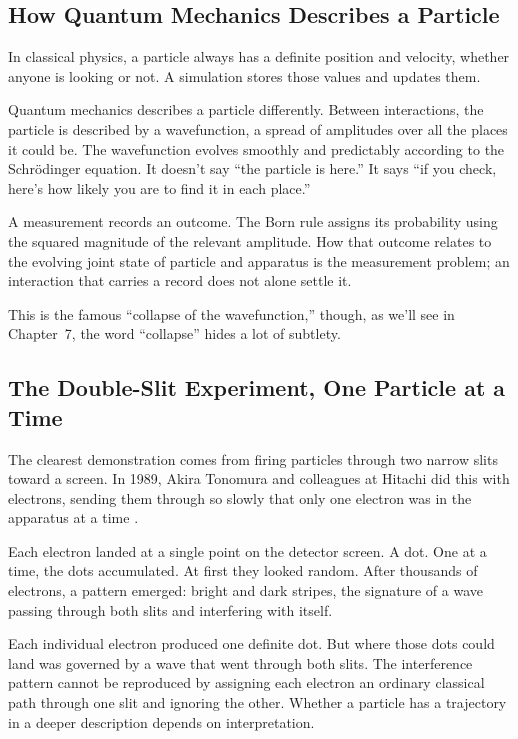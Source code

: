 \subsection{How Quantum Mechanics Describes a Particle}

In classical physics, a particle always has a definite position and velocity, whether anyone is looking or not. A simulation stores those values and updates them.

Quantum mechanics describes a particle differently. Between interactions, the particle is described by a wavefunction, a spread of amplitudes over all the places it could be. The wavefunction evolves smoothly and predictably according to the Schrödinger equation. It doesn't say ``the particle is here.'' It says ``if you check, here's how likely you are to find it in each place.''

A measurement records an outcome. The Born rule assigns its probability using the squared magnitude of the relevant amplitude. How that outcome relates to the evolving joint state of particle and apparatus is the measurement problem; an interaction that carries a record does not alone settle it.

This is the famous ``collapse of the wavefunction,'' though, as we'll see in Chapter~7, the word ``collapse'' hides a lot of subtlety.

\subsection{The Double-Slit Experiment, One Particle at a Time}

The clearest demonstration comes from firing particles through two narrow slits toward a screen. In 1989, Akira Tonomura and colleagues at Hitachi did this with electrons, sending them through so slowly that only one electron was in the apparatus at a time \cite{tonomura1989}.

Each electron landed at a single point on the detector screen. A dot. One at a time, the dots accumulated. At first they looked random. After thousands of electrons, a pattern emerged: bright and dark stripes, the signature of a wave passing through both slits and interfering with itself.

Each individual electron produced one definite dot. But where those dots could land was governed by a wave that went through both slits. The interference pattern cannot be reproduced by assigning each electron an ordinary classical path through one slit and ignoring the other. Whether a particle has a trajectory in a deeper description depends on interpretation.

